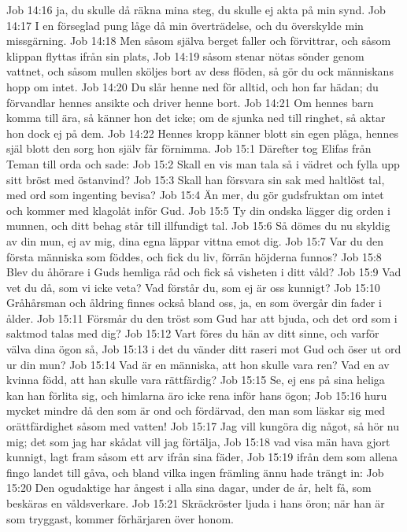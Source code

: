 Job 14:16  ja, du skulle då räkna mina steg, du skulle ej akta på min synd.
Job 14:17  I en förseglad pung låge då min överträdelse, och du överskylde min missgärning.
Job 14:18  Men såsom själva berget faller och förvittrar, och såsom klippan flyttas ifrån sin plats,
Job 14:19  såsom stenar nötas sönder genom vattnet, och såsom mullen sköljes bort av dess flöden, så gör du ock människans hopp om intet.
Job 14:20  Du slår henne ned för alltid, och hon far hädan; du förvandlar hennes ansikte och driver henne bort.
Job 14:21  Om hennes barn komma till ära, så känner hon det icke; om de sjunka ned till ringhet, så aktar hon dock ej på dem.
Job 14:22  Hennes kropp känner blott sin egen plåga, hennes själ blott den sorg hon själv får förnimma.
Job 15:1  Därefter tog Elifas från Teman till orda och sade:
Job 15:2  Skall en vis man tala så i vädret och fylla upp sitt bröst med östanvind?
Job 15:3  Skall han försvara sin sak med haltlöst tal, med ord som ingenting bevisa?
Job 15:4  Än mer, du gör gudsfruktan om intet och kommer med klagolåt inför Gud.
Job 15:5  Ty din ondska lägger dig orden i munnen, och ditt behag står till illfundigt tal.
Job 15:6  Så dömes du nu skyldig av din mun, ej av mig, dina egna läppar vittna emot dig.
Job 15:7  Var du den första människa som föddes, och fick du liv, förrän höjderna funnos?
Job 15:8  Blev du åhörare i Guds hemliga råd och fick så visheten i ditt våld?
Job 15:9  Vad vet du då, som vi icke veta? Vad förstår du, som ej är oss kunnigt?
Job 15:10  Gråhårsman och åldring finnes också bland oss, ja, en som övergår din fader i ålder.
Job 15:11  Försmår du den tröst som Gud har att bjuda, och det ord som i saktmod talas med dig?
Job 15:12  Vart föres du hän av ditt sinne, och varför välva dina ögon så,
Job 15:13  i det du vänder ditt raseri mot Gud och öser ut ord ur din mun?
Job 15:14  Vad är en människa, att hon skulle vara ren? Vad en av kvinna född, att han skulle vara rättfärdig?
Job 15:15  Se, ej ens på sina heliga kan han förlita sig, och himlarna äro icke rena inför hans ögon;
Job 15:16  huru mycket mindre då den som är ond och fördärvad, den man som läskar sig med orättfärdighet såsom med vatten!
Job 15:17  Jag vill kungöra dig något, så hör nu mig; det som jag har skådat vill jag förtälja,
Job 15:18  vad visa män hava gjort kunnigt, lagt fram såsom ett arv ifrån sina fäder,
Job 15:19  ifrån dem som allena fingo landet till gåva, och bland vilka ingen främling ännu hade trängt in:
Job 15:20  Den ogudaktige har ångest i alla sina dagar, under de år, helt få, som beskäras en våldsverkare.
Job 15:21  Skräckröster ljuda i hans öron; när han är som tryggast, kommer förhärjaren över honom.
